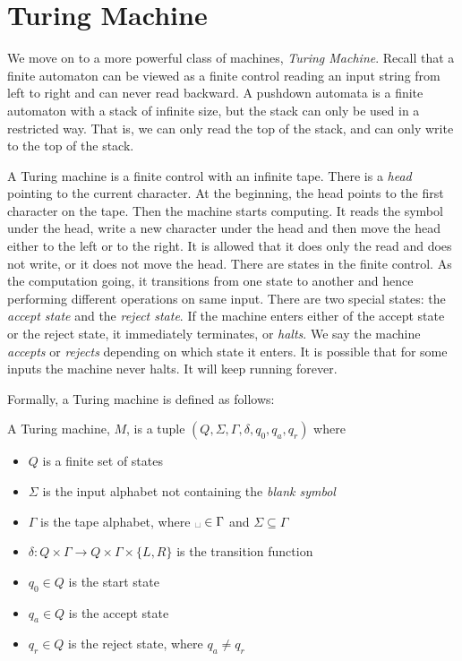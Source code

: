 \documentclass[11pt]{article}
\begin{document}
\section{Turing Machine}

We move on to a more powerful class of machines, \emph{Turing Machine}. Recall that a finite
automaton can be viewed as a finite control reading an input string from left to right and can never
read backward. A pushdown automata is a finite automaton with a stack of infinite size, but the
stack can only be used in a restricted way. That is, we can only read the top of the stack, and can
only write to the top of the stack.

A Turing machine is a finite control with an infinite tape. There is a \emph{head} pointing to the
current character. At the beginning, the head points to the first character on the tape. Then the
machine starts computing. It reads the symbol under the head, write a new character under the head
and then move the head either to the left or to the right. It is allowed that it does only the read
and does not write, or it does not move the head. There are states in the finite control. As the
computation going, it transitions from one state to another and hence performing different
operations on same input. There are two special states: the \emph{accept state} and the
\emph{reject state}. If the machine enters either of the accept state or the reject state, it
immediately terminates, or \emph{halts}. We say the machine \emph{accepts} or \emph{rejects}
depending on which state it enters. It is possible that for some inputs the machine never halts. It
will keep running forever.

Formally, a Turing machine is defined as follows:
\begin{definition}
A Turing machine, $M$, is a tuple $(Q,\Sigma,\Gamma,\delta,q_0,q_a,q_r)$ where
\begin{itemize}
\item $Q$ is a finite set of states
\item $\Sigma$ is the input alphabet not containing the \emph{blank symbol \textvisiblespace}
\item $\Gamma$ is the tape alphabet, where $\text{\textvisiblespace} \in \Gamma$ and $\Sigma
\subseteq \Gamma$
\item $\delta : Q \times \Gamma \rightarrow Q \times \Gamma \times \{L,R\}$ is the transition function
\item $q_0 \in Q$ is the start state
\item $q_a \in Q$ is the accept state
\item $q_r \in Q$ is the reject state, where $q_a \neq q_r$
\end{itemize}
\end{definition}
\end{document}
